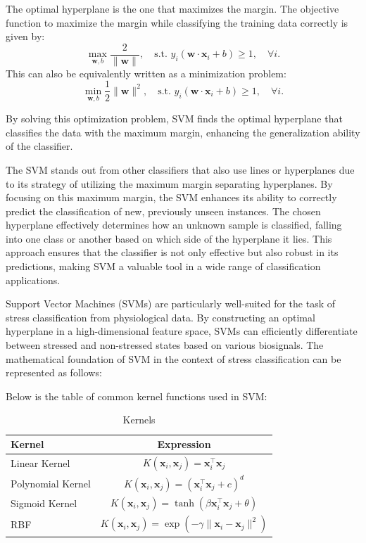 The optimal hyperplane is the one that maximizes the margin. The objective function to maximize the margin while classifying the training data correctly is given by:
\begin{equation}
    \max_{\mathbf{w}, b} \frac{2}{\|\mathbf{w}\|}, \quad \text{s.t. } y_i(\mathbf{w} \cdot \mathbf{x}_i + b) \geq 1, \quad \forall i.
\end{equation}
This can also be equivalently written as a minimization problem:
\begin{equation}
    \min_{\mathbf{w}, b} \frac{1}{2} \|\mathbf{w}\|^2, \quad \text{s.t. } y_i(\mathbf{w} \cdot \mathbf{x}_i + b) \geq 1, \quad \forall i.
\end{equation}

By solving this optimization problem, SVM finds the optimal hyperplane that classifies the data with the maximum margin, enhancing the generalization ability of the classifier.


The SVM stands out from other classifiers that also use lines or hyperplanes due to its strategy of utilizing the maximum margin separating hyperplanes. By focusing on this maximum margin, the SVM enhances its ability to correctly predict the classification of new, previously unseen instances. The chosen hyperplane effectively determines how an unknown sample is classified, falling into one class or another based on which side of the hyperplane it lies. This approach ensures that the classifier is not only effective but also robust in its predictions, making SVM a valuable tool in a wide range of classification applications.

Support Vector Machines (SVMs) are particularly well-suited for the task of stress classification from physiological data. By constructing an optimal hyperplane in a high-dimensional feature space, SVMs can efficiently differentiate between stressed and non-stressed states based on various biosignals. The mathematical foundation of SVM in the context of stress classification can be represented as follows:

Below is the table of common kernel functions used in SVM:
\begin{table}[!ht]
    \centering
    \caption{Kernels}
    \label{tab:kernels}
    \begin{tabular}{|l|c|}
    \hline
    \textbf{Kernel}        & \textbf{Expression}                               \\ \hline
    Linear Kernel          & \( K(\mathbf{x}_i, \mathbf{x}_j) = \mathbf{x}_i^\top \mathbf{x}_j \)                \\ \hline
    Polynomial Kernel      & \( K(\mathbf{x}_i, \mathbf{x}_j) = (\mathbf{x}_i^\top \mathbf{x}_j + c)^d \)       \\ \hline
    Sigmoid Kernel         & \( K(\mathbf{x}_i, \mathbf{x}_j) = \tanh(\beta \mathbf{x}_i^\top \mathbf{x}_j + \theta) \) \\ \hline
    RBF                    & \( K(\mathbf{x}_i, \mathbf{x}_j) = \exp(-\gamma \|\mathbf{x}_i - \mathbf{x}_j \|^2) \)   \\ \hline
    \end{tabular}
    \end{table}
    
